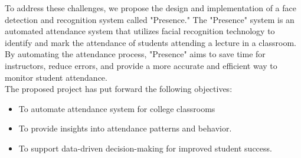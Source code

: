 To address these challenges, we propose the design and implementation of a face detection and recognition system called "Presence." The "Presence" system is an automated attendance system that utilizes facial recognition technology to identify and mark the attendance of students attending a lecture in a classroom. By automating the attendance process, "Presence" aims to save time for instructors, reduce errors, and provide a more accurate and efficient way to monitor student attendance.\\

The proposed project has put forward the following objectives:

\begin{itemize}
	\item To automate attendance system for college classrooms
	\item To provide insights into attendance patterns and behavior.
        \item To support data-driven decision-making for improved student success.
  
\end{itemize}